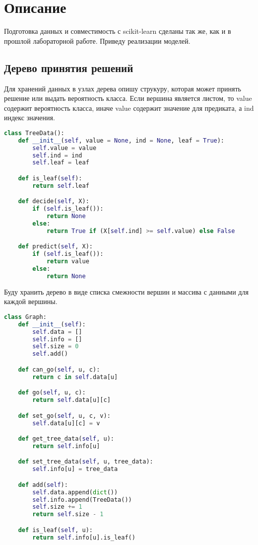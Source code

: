\section{Описание}

Подготовка данных и совместимость с scikit-learn сделаны так же, как и в прошлой лабораторной работе. Приведу реализации моделей.

\subsection{Дерево принятия решений}
Для хранений данных в узлах дерева опишу струкуру, которая может принять решение или выдать вероятность класса. Если вершина является листом, то value содержит вероятность класса, иначе value содержит значение для предиката, а ind индекс значения.
\begin{lstlisting}[language=Python]
class TreeData():
    def __init__(self, value = None, ind = None, leaf = True):
        self.value = value
        self.ind = ind
        self.leaf = leaf

    def is_leaf(self):
        return self.leaf

    def decide(self, X):
        if (self.is_leaf()):
            return None
        else:
            return True if (X[self.ind] >= self.value) else False

    def predict(self, X):
        if (self.is_leaf()):
            return value
        else:
            return None
\end{lstlisting}
\pagebreak

Буду хранить дерево в виде списка смежности вершин и массива с данными для каждой вершины.
\begin{lstlisting}[language=Python]
class Graph:
    def __init__(self):
        self.data = []
        self.info = []
        self.size = 0
        self.add()

    def can_go(self, u, c):
        return c in self.data[u]

    def go(self, u, c):
        return self.data[u][c]

    def set_go(self, u, c, v):
        self.data[u][c] = v

    def get_tree_data(self, u):
        return self.info[u]

    def set_tree_data(self, u, tree_data):
        self.info[u] = tree_data

    def add(self):
        self.data.append(dict())
        self.info.append(TreeData())
        self.size += 1
        return self.size - 1

    def is_leaf(self, u):
        return self.info[u].is_leaf()
\end{lstlisting}
\pagebreak

